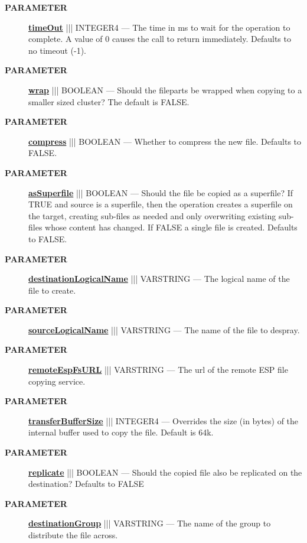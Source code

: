 \par
\begin{description}
\item [\colorbox{tagtype}{\color{white} \textbf{\textsf{PARAMETER}}}] \textbf{\underline{timeOut}} ||| INTEGER4 --- The time in ms to wait for the operation to complete. A value of 0 causes the call to return immediately. Defaults to no timeout (-1).
\item [\colorbox{tagtype}{\color{white} \textbf{\textsf{PARAMETER}}}] \textbf{\underline{wrap}} ||| BOOLEAN --- Should the fileparts be wrapped when copying to a smaller sized cluster? The default is FALSE.
\item [\colorbox{tagtype}{\color{white} \textbf{\textsf{PARAMETER}}}] \textbf{\underline{compress}} ||| BOOLEAN --- Whether to compress the new file. Defaults to FALSE.
\item [\colorbox{tagtype}{\color{white} \textbf{\textsf{PARAMETER}}}] \textbf{\underline{asSuperfile}} ||| BOOLEAN --- Should the file be copied as a superfile? If TRUE and source is a superfile, then the operation creates a superfile on the target, creating sub-files as needed and only overwriting existing sub-files whose content has changed. If FALSE a single file is created. Defaults to FALSE.
\item [\colorbox{tagtype}{\color{white} \textbf{\textsf{PARAMETER}}}] \textbf{\underline{destinationLogicalName}} ||| VARSTRING --- The logical name of the file to create.
\item [\colorbox{tagtype}{\color{white} \textbf{\textsf{PARAMETER}}}] \textbf{\underline{sourceLogicalName}} ||| VARSTRING --- The name of the file to despray.
\item [\colorbox{tagtype}{\color{white} \textbf{\textsf{PARAMETER}}}] \textbf{\underline{remoteEspFsURL}} ||| VARSTRING --- The url of the remote ESP file copying service.
\item [\colorbox{tagtype}{\color{white} \textbf{\textsf{PARAMETER}}}] \textbf{\underline{transferBufferSize}} ||| INTEGER4 --- Overrides the size (in bytes) of the internal buffer used to copy the file. Default is 64k.
\item [\colorbox{tagtype}{\color{white} \textbf{\textsf{PARAMETER}}}] \textbf{\underline{replicate}} ||| BOOLEAN --- Should the copied file also be replicated on the destination? Defaults to FALSE
\item [\colorbox{tagtype}{\color{white} \textbf{\textsf{PARAMETER}}}] \textbf{\underline{destinationGroup}} ||| VARSTRING --- The name of the group to distribute the file across.

\end{description}
